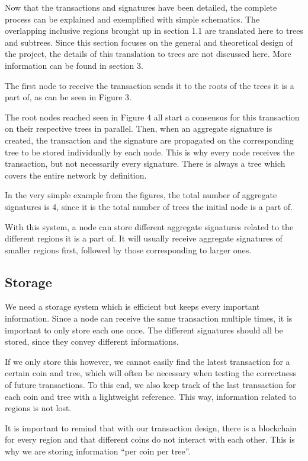 \documentclass[11pt, a4paper, twoside, openright]{article}
\begin{document}
Now that the transactions and signatures have been detailed, the complete process can be explained and exemplified with simple schematics. The overlapping inclusive regions brought up in section 1.1 are translated here to trees and subtrees. Since this section focuses on the general and theoretical design of the project, the details of this translation to trees are not discussed here. More information can be found in section 3.

\newpage

The first node to receive the transaction sends it to the roots of the trees it is a part of, as can be seen in Figure 3.

The root nodes reached seen in Figure 4 all start a consensus for this transaction on their respective trees in parallel. Then, when an aggregate signature is created, the transaction and the signature are propagated on the corresponding tree to be stored individually by each node. This is why every node receives the transaction, but not necessarily every signature. There is always a tree which covers the entire network by definition.

In the very simple example from the figures, the total number of aggregate signatures is 4, since it is the total number of trees the initial node is a part of.

With this system, a node can store different aggregate signatures related to the different regions it is a part of. It will usually receive aggregate signatures of smaller regions first, followed by those corresponding to larger ones.

\subsection{Storage}

We need a storage system which is efficient but keeps every important information. Since a node can receive the same transaction multiple times, it is important to only store each one once. The different signatures should all be stored, since they convey different informations. 

If we only store this however, we cannot easily find the latest transaction for a certain coin and tree, which will often be necessary when testing the correctness of future transactions. To this end, we also keep track of the last transaction for each coin and tree with a lightweight reference. This way, information related to regions is not lost.

It is important to remind that with our transaction design, there is a blockchain for every region and that different coins do not interact with each other. This is why we are storing information ``per coin per tree''.
\end{document}
